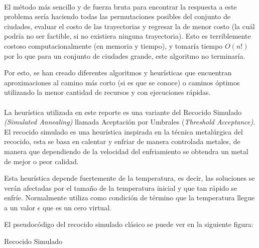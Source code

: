 \documentclass[12pt]{article}
\begin{document}
	\paragraph{}
	El método más sencillo y de fuerza bruta para encontrar la respuesta a este problema
	sería haciendo todas las permutaciones posibles del conjunto de ciudades, evaluar
	el costo de las trayectorias y regresar la de menor costo (la cuál podría no ser
	factible, si no existiera ninguna trayectoria). Esto es terriblemente costoso 
	computacionalmente (en memoria y tiempo), y tomaría tiempo $O(n!)$ por lo que para 
	un conjunto de ciudades grande, este algoritmo no terminaría.
	
	Por esto, se han creado diferentes algoritmos y heurísticas que encuentran
	aproximaciones al camino más corto (si es que se conoce) o caminos óptimos 
	utilizando la menor cantidad de recursos y con ejecuciones rápidas.
	
	\paragraph{}
	La heurística utilizada en este reporte es una variante del Recocido Simulado 	\textit{(Simulated Annealing)} llamada Aceptación por Umbrales (\textit{Threshold 
	Acceptance)}. El recocido simulado es una heurística inspirada en la técnica 
	metalúrgica del recocido, esta se basa en calentar y enfriar de manera controlada 
	metales, de manera que dependiendo de la velocidad del enfriamiento se obtendra un metal de mejor o peor calidad.
	
	Esta heurística depende fuertemente de la temperatura, es decir, las soluciones se
	verán afectadas por el tamaño de la temperatura inicial y que tan rápido se enfríe.
	Normalmente utiliza como condición de término que la temperatura llegue a un valor 
	$\epsilon$ que es un cero virtual.
	
	El pseudocódigo del recocido simulado clásico se puede ver en la siguiente figura:
	
	\begin{algorithm}[H]
		\SetAlgoLined
		\caption{Recocido Simulado}
	\end{algorithm} 
	
\end{document}
